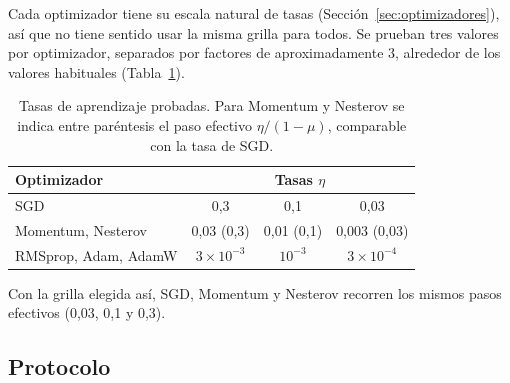 Cada optimizador tiene su escala natural de tasas (Sección~\ref{sec:optimizadores}), así que no tiene sentido usar la misma
grilla para todos. Se prueban tres valores por optimizador, separados por factores de aproximadamente 3, alrededor de los valores
habituales (Tabla~\ref{tab:tasas}).

\begin{table}[ht]
\centering
\caption{Tasas de aprendizaje probadas. Para Momentum y Nesterov se indica entre paréntesis el paso efectivo
$\eta/(1 - \mu)$, comparable con la tasa de SGD.}
\label{tab:tasas}
\begin{tabular}{lccc}
\toprule
Optimizador & \multicolumn{3}{c}{Tasas $\eta$} \\
\midrule
SGD               & 0,3 & 0,1 & 0,03 \\
Momentum, Nesterov & 0,03 (0,3) & 0,01 (0,1) & 0,003 (0,03) \\
RMSprop, Adam, AdamW & $3\times10^{-3}$ & $10^{-3}$ & $3\times10^{-4}$ \\
\bottomrule
\end{tabular}
\end{table}

Con la grilla elegida así, SGD, Momentum y Nesterov recorren los mismos pasos efectivos (0,03, 0,1 y 0,3).

\subsection{Protocolo}

